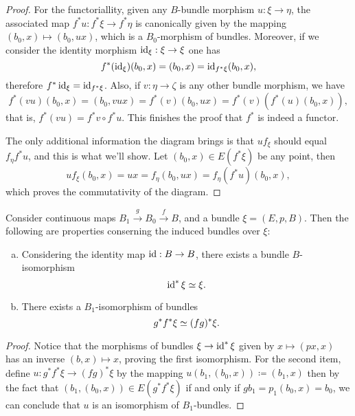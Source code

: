 \documentclass[../../../deep-dive]{subfile}
\begin{document}
\begin{proof}
For the functoriallity, given any \(B\)-bundle morphism \(u: \xi \to \eta\), the
associated map \(f^{*} u: f^{*} \xi \to f^{*} \eta\) is canonically given by the
mapping \((b_0, x) \mapsto (b_0, u x)\), which is a \(B_0\)-morphism of
bundles. Moreover, if we consider the identity morphism \(\operatorname{id}_{\xi}: \xi \to
\xi\) one has
\[
f^{*}(\operatorname{id}_{\xi})(b_0, x) = (b_0, x) = \operatorname{id}_{f^{*} \xi}(b_0, x),
\]
therefore \(f^{*} \operatorname{id}_{\xi} = \operatorname{id}_{f^{*} \xi}\). Also, if \(v: \eta \to \zeta\)
is any other bundle morphism, we have
\[
f^{*}(v u)(b_0, x)
= (b_0, v u x)
= f^{*}(v)(b_0, u x)
= f^{*}(v)(f^{*}(u)(b_0, x)),
\]
that is, \(f^{*}(v u) = f^{*} v \circ f^{*} u\). This finishes the proof that
\(f^{*}\) is indeed a functor.

The only additional information the diagram brings is that \(u f_{\xi}\) should
equal \(f_{\eta} f^{*} u\), and this is what we'll show. Let \((b_0, x) \in
E(f^{*} \xi)\) be any point, then
\[
u f_{\xi} (b_0, x)
= u x
= f_{\eta}(b_0, u x)
= f_{\eta} (f^{*} u) (b_0, x),
\]
which proves the commutativity of the diagram.
\end{proof}

\begin{proposition}
\label{prop:induced-bundle-functorial-transitivity}
Consider continuous maps \(B_1 \xrightarrow g B_0 \xrightarrow f B\), and a
bundle \(\xi = (E, p, B)\). Then the following are properties conserning the
induced bundles over \(\xi\):
\begin{enumerate}[(a)]\setlength\itemsep{0em}
\item Considering the identity map \(\operatorname{id}: B \to B\), there exists a bundle
  \(B\)-isomorphism
  \[
  \operatorname{id}^{*} \xi \simeq \xi.
  \]

\item There exists a \(B_1\)-isomorphism of bundles
  \[
  g^{*} f^{*} \xi \simeq (f g)^{*} \xi.
  \]
\end{enumerate}
\end{proposition}

\begin{proof}
Notice that the morphisms of bundles \(\xi \to \operatorname{id}^{*} \xi\) given by
\(x \mapsto (p x, x)\) has an inverse \((b, x) \mapsto x\), proving the first
isomorphism. For the second item, define
\(u: g^{*} f^{*} \xi \to (f g)^{*} \xi\) by the mapping
\(u(b_1, (b_0, x)) \coloneq (b_1, x)\) then by the fact that
\((b_1, (b_0, x)) \in E (g^{*} f^{*} \xi)\) if and only if
\(g b_1 = p_1(b_0, x) = b_0\), we can conclude that \(u\) is an isomorphism of
\(B_1\)-bundles.
\end{proof}
\end{document}
